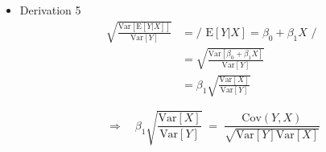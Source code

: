 \documentclass{article}
\begin{document}
\begin{itemize}
    \begin{align*}
        \frac{\partial}{\partial \beta_1}\mathbb{\text{E}}\left[(Y-(\beta_0+\beta_1 X))^2\right] &= 0 \\
        \mathbb{\text{E}}\left[\frac{\partial}{\partial \beta_1}\left(Y-\mathbb{\text{E}}[Y]-\beta_1(X-\mathbb{\text{E}}[X])\right)^2\right] &= 0 \\
        \mathbb{\text{E}}\left[-2(X-\mathbb{\text{E}}[X])\left(Y-\mathbb{\text{E}}[Y]-\beta_1(X-\mathbb{\text{E}}[X])\right)\right] &= 0 \\
        \mathbb{\text{E}}\left[(X-\mathbb{\text{E}}[X])(Y-\mathbb{\text{E}}[Y])\right] - \beta_1\,\mathbb{\text{E}}\left[(X-\mathbb{\text{E}}[X])^2\right] &= 0 \\
        \mathbb{\text{E}}[XY] - \mathbb{\text{E}}[X]\mathbb{\text{E}}[Y] - \beta_1\,\text{Var}[X] &= 0 \\
        \text{Cov}[Y,X] - \beta_1\,\text{Var}[X] &= 0 \\
        \beta_1 &= \frac{\text{Cov}[Y,X]}{\text{Var}[X]}
    \end{align*}
    
    \begin{align*}
        \Rightarrow\ h^{\star}(x_0) = \left(\mathbb{\text{E}}[Y] - \frac{\text{Cov}[Y,X]}{\text{Var}[X]}\,\mathbb{\text{E}}[X]\right) + \frac{\text{Cov}[Y,X]}{\text{Var}[X]}\,x_0
    \end{align*}

    \item Derivation 5
    \begin{align*}
        \sqrt{\frac{\text{Var}[\text{E}[Y|X]]}{\text{Var}[Y]}}
        &= \text{/ }\text{E}[Y|X] = \beta_0 + \beta_1 X \text{ / } \\
        &= \sqrt{\frac{\text{Var}[\beta_0+\beta_1 X]}{\text{Var}[Y]}} \\
        &= \beta_1\sqrt{\frac{\text{Var}[X]}{\text{Var}[Y]}}
    \end{align*}
    
    \[
    \Longrightarrow \quad \beta_1\sqrt{\frac{\text{Var}[X]}{\text{Var}[Y]}} \;=\; \frac{\text{Cov}(Y,X)}{\sqrt{\text{Var}[Y]\text{Var}[X]}}
    \]
    

\end{itemize}
\end{document}
